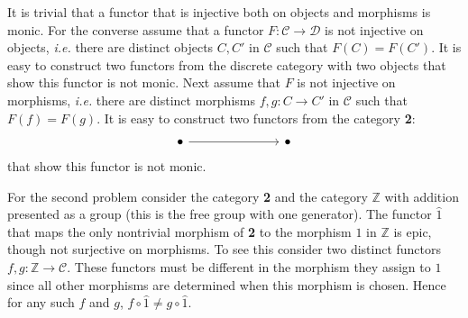 It is trivial that a functor that is injective both on objects and morphisms is monic. For the converse assume that a functor $F:\mathcal{C}\to\mathcal{D}$ is not injective on objects, \emph{i.e.} there are distinct objects $C,C'$ in $\mathcal{C}$ such that $F(C)=F(C')$. It is easy to construct two functors from the discrete category with two objects that show this functor is not monic. Next assume that $F$ is not injective on morphisms, \emph{i.e.} there are distinct morphisms $f,g:C\to C'$ in $\mathcal{C}$ such that $F(f)=F(g)$. It is easy to construct two functors from the category \textbf{2}:
\[\begin{tikzcd}
	\bullet &&& \bullet
	\arrow[from=1-1, to=1-4]
\end{tikzcd}\]
that show this functor is not monic.

For the second problem consider the category \textbf{2} and the category $\mathbb{Z}$ with addition presented as a group (this is the free group with one generator). The functor $\hat{1}$ that maps the only nontrivial morphism of \textbf{2} to the morphism $1$ in $\mathbb{Z}$ is epic, though not surjective on morphisms. To see this consider two distinct functors $f,g:\mathbb{Z}\to\mathcal{C}$. These functors must be different in the morphism they assign to $1$ since all other morphisms are determined when this morphism is chosen. Hence for any such $f$ and $g$, $f\circ\hat{1}\neq g\circ\hat{1}$.
